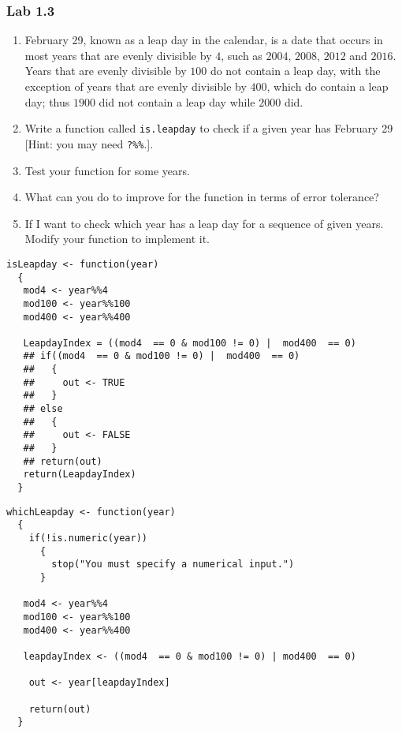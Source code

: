 \documentclass[10pt]{beamer}
\begin{document}
\begin{frame}
\frametitle{Lab 1.3}

\begin{enumerate}
\item February 29, known as a leap day in the calendar, is a date that occurs
  in most years that are evenly divisible by $4$, such as $2004$, $2008$,
  $2012$ and $2016$. Years that are evenly divisible by $100$ do not contain a
  leap day, with the exception of years that are evenly divisible by $400$,
  which do contain a leap day; thus $1900$ did not contain a leap day while
  $2000$ did.

\item Write a function called \texttt{is.leapday} to check if a given year has
  February 29 [Hint:  you may need \texttt{?\%\%}.].

\item Test your function for some years.

\item What can you do to improve for the function in terms of error tolerance?

\item If I want to check which year has a leap day for a sequence of given
  years. Modify your function to implement it.
\end{enumerate}

\end{frame}

\begin{frame}[fragile]
\begin{verbatim}
isLeapday <- function(year)
  {
   mod4 <- year%%4
   mod100 <- year%%100
   mod400 <- year%%400

   LeapdayIndex = ((mod4  == 0 & mod100 != 0) |  mod400  == 0)
   ## if((mod4  == 0 & mod100 != 0) |  mod400  == 0)
   ##   {
   ##     out <- TRUE
   ##   }
   ## else
   ##   {
   ##     out <- FALSE
   ##   }
   ## return(out)
   return(LeapdayIndex)
  }
\end{verbatim}
\end{frame}

\begin{frame}[fragile]
\begin{verbatim}
whichLeapday <- function(year)
  {
    if(!is.numeric(year))
      {
        stop("You must specify a numerical input.")
      }

   mod4 <- year%%4
   mod100 <- year%%100
   mod400 <- year%%400

   leapdayIndex <- ((mod4  == 0 & mod100 != 0) | mod400  == 0)

    out <- year[leapdayIndex]

    return(out)
  }
\end{verbatim}
\end{frame}
\end{document}
